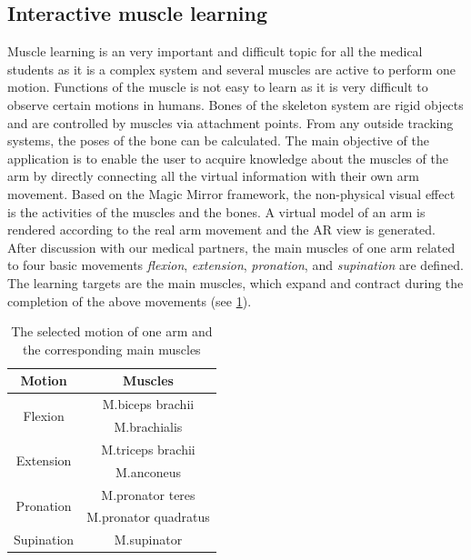 \subsection{Interactive muscle learning}
Muscle learning is an very important and difficult topic for all the medical students as it is a complex system and several muscles are active to perform one motion.
Functions of the muscle is not easy to learn as it is very difficult to observe certain motions in humans.
Bones of the skeleton system are rigid objects and are controlled by muscles via attachment points. From any outside tracking systems, the poses of the bone can be calculated.
The main objective of the application is to enable the user to acquire knowledge about the muscles of the arm %
by directly connecting all the virtual information with their own arm movement. 
Based on the Magic Mirror framework, the non-physical visual effect is the activities of the muscles and the bones. A virtual model of an arm is rendered according to the real arm movement and the AR view is generated.
After discussion with our medical partners, the main muscles of one arm related to four basic movements \textit{flexion}, \textit{extension}, \textit{pronation}, and \textit{supination} are defined. The learning targets are the main muscles, which expand and contract during the completion of the above movements (see \tablename{\ref{tb:3-IMR:motionMuscles}}). 
\begin{table}
	\caption[Muscles involved]{The selected motion of one arm and the corresponding main muscles}
	\centering
	\label{tb:3-IMR:motionMuscles}
	\scriptsize
	\begin{center}
		\begin{tabular}{|c|c|}
			\hline
			Motion & Muscles \\
			\hline
			\multirow{2}{*}{Flexion} & M.biceps brachii \\
			& M.brachialis \\
			\hline
			\multirow{2}{*}{Extension} & M.triceps brachii \\
			& M.anconeus \\
			\hline
			\multirow{2}{*}{Pronation} & M.pronator teres \\
			& M.pronator quadratus \\
			\hline
			Supination &M.supinator \\
			\hline
		\end{tabular}
	\end{center}
\end{table}

